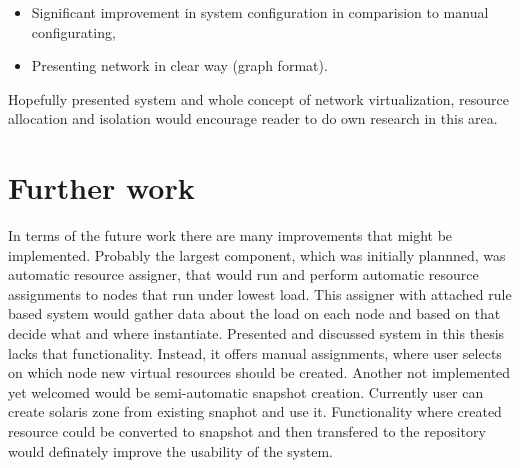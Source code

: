 \documentclass[11pt]{book}
\begin{document}
		\begin{itemize}
			\item{Significant improvement in system configuration in comparision to manual configurating,}
			\item{Presenting network in clear way (graph format).}
		\end{itemize}
		
	    Hopefully presented system and whole concept of network virtualization, resource allocation and isolation 
	    would encourage reader to do own research in this area.
		
		

    \section{Further work}
		\label{sub:sum:further}
	
      In terms of the future work there are many improvements that might be implemented. Probably the largest component,
      which was initially plannned, was automatic resource assigner, that would run and perform automatic resource
      assignments to nodes that run under lowest load. This assigner with attached rule based system would gather data
      about the load on each node and based on that decide what and where instantiate. Presented and discussed system in
      this thesis lacks that functionality. Instead, it offers manual assignments, where user selects on which node new
      virtual resources should be created. Another not implemented yet welcomed would be semi-automatic snapshot creation. 
      Currently user can create solaris zone from existing snaphot and use it. Functionality where created resource could be 
      converted to snapshot and then transfered to the repository would definately improve the usability of the system.


  \printglossaries

  
  
\end{document}

